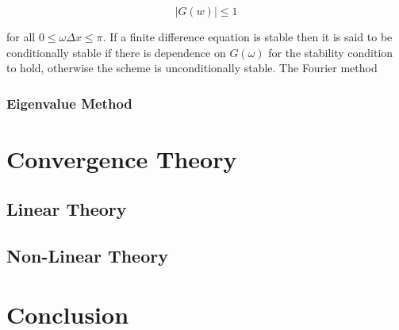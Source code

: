 \documentclass[../main.tex]{subfiles}
\begin{document}
  \begin{equation}
    \left\vert G(w) \right\vert \leq 1
  \end{equation}

  for all $0 \leq \omega \Delta x \leq \pi$. If a finite difference equation is stable then it is said to be conditionally stable if there is dependence on $G(\omega)$ for the stability condition to hold, otherwise the scheme is unconditionally stable. The Fourier method

  \subsubsection{Eigenvalue Method}

  \section{Convergence Theory}

  \subsection{Linear Theory}

  \subsection{Non-Linear Theory}

  \section{Conclusion}
\end{document}
